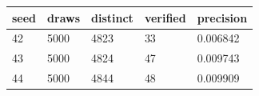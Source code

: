 \begin{tabular}{lllll}
\toprule
seed & draws & distinct & verified & precision \\
\midrule
42 & 5000 & 4823 & 33 & 0.006842 \\
43 & 5000 & 4824 & 47 & 0.009743 \\
44 & 5000 & 4844 & 48 & 0.009909 \\
\bottomrule
\end{tabular}
